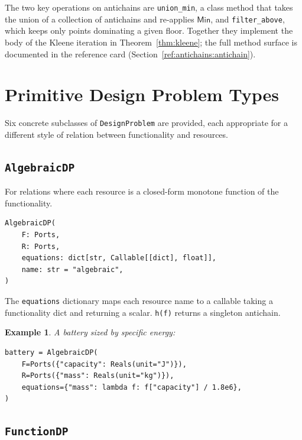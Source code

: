 \documentclass[11pt,a4paper]{article}
\newtheorem{example}[definition]{Example}
\newcommand{\Min}{\mathsf{Min}}
\begin{document}
The two key operations on antichains are \texttt{union\_min}, a class
method that takes the union of a collection of antichains and re-applies
$\Min$, and \texttt{filter\_above}, which keeps only points dominating a
given floor. Together they implement the body of the Kleene iteration in
Theorem~\ref{thm:kleene}; the full method surface is documented in the
reference card (Section~\ref{ref:antichains:antichain}).

\section{Primitive Design Problem Types}
\label{sec:primitives}

Six concrete subclasses of \texttt{DesignProblem} are provided, each
appropriate for a different style of relation between functionality
and resources.

\subsection{\texttt{AlgebraicDP}}

For relations where each resource is a closed-form monotone function
of the functionality.

\begin{lstlisting}
AlgebraicDP(
    F: Ports,
    R: Ports,
    equations: dict[str, Callable[[dict], float]],
    name: str = "algebraic",
)
\end{lstlisting}

The \texttt{equations} dictionary maps each resource name to a
callable taking a functionality dict and returning a scalar.
\texttt{h(f)} returns a singleton antichain.

\begin{example}
A battery sized by specific energy:
\begin{lstlisting}
battery = AlgebraicDP(
    F=Ports({"capacity": Reals(unit="J")}),
    R=Ports({"mass": Reals(unit="kg")}),
    equations={"mass": lambda f: f["capacity"] / 1.8e6},
)
\end{lstlisting}
\end{example}

\subsection{\texttt{FunctionDP}}
\end{document}
